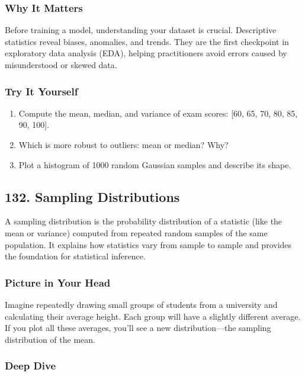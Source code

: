 \documentclass[
  letterpaper,
  DIV=11,
  numbers=noendperiod]{scrreprt}
\providecommand{\tightlist}{%
  \setlength{\itemsep}{0pt}\setlength{\parskip}{0pt}}
\begin{document}
\subsubsection{Why It Matters}\label{why-it-matters-28}

Before training a model, understanding your dataset is crucial.
Descriptive statistics reveal biases, anomalies, and trends. They are
the first checkpoint in exploratory data analysis (EDA), helping
practitioners avoid errors caused by misunderstood or skewed data.

\subsubsection{Try It Yourself}\label{try-it-yourself-130}

\begin{enumerate}
\def\labelenumi{\arabic{enumi}.}
\tightlist
\item
  Compute the mean, median, and variance of exam scores: {[}60, 65, 70,
  80, 85, 90, 100{]}.
\item
  Which is more robust to outliers: mean or median? Why?
\item
  Plot a histogram of 1000 random Gaussian samples and describe its
  shape.
\end{enumerate}

\subsection{132. Sampling Distributions}\label{sampling-distributions}

A sampling distribution is the probability distribution of a statistic
(like the mean or variance) computed from repeated random samples of the
same population. It explains how statistics vary from sample to sample
and provides the foundation for statistical inference.

\subsubsection{Picture in Your Head}\label{picture-in-your-head-131}

Imagine repeatedly drawing small groups of students from a university
and calculating their average height. Each group will have a slightly
different average. If you plot all these averages, you'll see a new
distribution---the sampling distribution of the mean.

\subsubsection{Deep Dive}\label{deep-dive-131}
\end{document}
